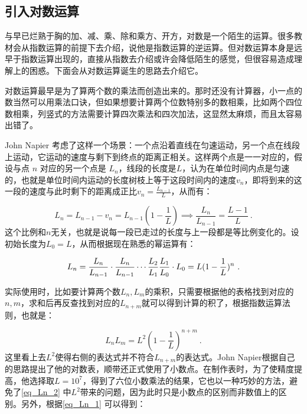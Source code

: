 \begin{issues}
\issueDraft
\end{issues}
\subsection{引入对数运算}

与早已烂熟于胸的加、减、乘、除和乘方、开方，对数是一个陌生的运算。很多教材会从指数运算的前提下去介绍，说他是指数运算的逆运算。但对数运算本身是远早于指数运算出现的，直接从指数去介绍或许会降低陌生的感觉，但很容易造成理解上的困惑。下面会从对数运算诞生的思路去介绍它。

对数运算最早是为了算两个数的乘法而创造出来的。那时还没有计算器，小一点的数当然可以用乘法口诀，但如果想要计算两个位数特别多的数相乘，比如两个四位数相乘，列竖式的方法需要计算四次乘法和四次加法，这显然太麻烦，而且太容易出错了。

John Napier 考虑了这样一个场景：一个点沿着直线在匀速运动，另一个点在线段上运动，它运动的速度与剩下到终点的距离正相关。这样两个点是一一对应的，假设与点 $n$ 对应的另一个点是 $L_n$，线段的长度是$L$，认为在单位时间内点是匀速的，也就是单位时间内运动的长度树枝上等于这段时间内的速度$v_n$，即将到来的这一段的速度与此时剩下的距离成正比$\displaystyle v_{n}=\frac{L_{n-1}}{L}$，从而有：

\begin{equation}
L_{n}=L_{n-1}-v_{n}=L_{n-1}(1-\frac{1}{L})\implies\frac{L_{n}}{L_{n-1}}= \frac{L-1}{L}~.
\end{equation}
这个比例和$n$无关，也就是说每一段已走过的长度与上一段都是等比例变化的。设初始长度为$L_{0}=L$，从而根据现在熟悉的幂运算有：

\begin{equation}\label{eq_Ln_1}
L_n={L_{n}\over L_{n-1}}\cdot{L_{n}\over L_{n-1}}\cdots{L_{2}\over L_{1}}{L_{1}\over L_{0}}\cdot L_0=L(1 - \frac{1}{L})^n~.
\end{equation}

实际使用时，比如要计算两个数$L_n,L_m$的乘积，只需要根据他的表格找到对应的$n,m$，求和后再反查找到对应的$L_{n+m}$就可以得到计算的积了，根据指数运算法则，也就是：

\begin{equation}\label{eq_Ln_2}
L_nL_m=L^2(1 - \frac{1}{L})^{n+m}~.
\end{equation}
这里看上去$L^2$使得右侧的表达式并不符合$L_{n+m}$的表达式。John Napier根据自己的思路提出了他的对数表，顺带还正式使用了小数点。在制作表时，为了使精度提高，他选择取$L=10^7$，得到了六位小数乘法的结果，它也以一种巧妙的方法，避免了\autoref{eq_Ln_2} 中$L^2$带来的问题，因为此时只是小数点的区别而非数值上的区别。另外，根据\autoref{eq_Ln_1} 可以得到：

